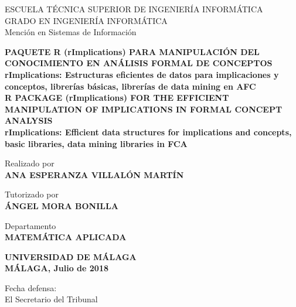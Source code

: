 \newpage
\thispagestyle{empty}
\mbox{}
\newpage
\thispagestyle{empty}
\mbox{}

\begin{titlepage}

    \begin{center}
		\normalsize {
            ESCUELA T\'ECNICA SUPERIOR DE INGENIER\'IA INFORM\'ATICA \\
            GRADO EN INGENIER\'IA INFORM\'ATICA \\
            Menci\'on en Sistemas de Informaci\'on \\}
	\end{center}

    \bigskip

    \begin{center}
		\normalsize {\textbf{
            PAQUETE R (rImplications) PARA MANIPULACI\'ON DEL CONOCIMIENTO 
            EN AN\'ALISIS FORMAL DE CONCEPTOS\\
            rImplications: Estructuras eficientes de datos para 
            implicaciones y conceptos, librer\'ias b\'asicas, 
            librer\'ias de data mining en AFC\\
            R PACKAGE (rImplications) FOR THE EFFICIENT MANIPULATION OF 
            IMPLICATIONS IN FORMAL CONCEPT ANALYSIS\\ 
            rImplications: Efficient data structures for implications 
            and concepts, basic libraries, data mining libraries in FCA
            }}
    \end{center}
    
    \smallskip

    \begin{center}
		\normalsize {
            Realizado por \\ \textbf{ANA ESPERANZA VILLAL\'ON MART\'IN}}
    \end{center}

    \begin{center}
		\normalsize {
            Tutorizado por \\ \textbf{\'ANGEL MORA BONILLA}}
    \end{center}

    \begin{center}
		\normalsize {
            Departamento \\ \textbf{MATEM\'ATICA APLICADA}}
    \end{center}

    \begin{center}
		\normalsize {
            \textbf{UNIVERSIDAD DE M\'ALAGA \\ M\'ALAGA, Julio de 2018}}
    \end{center}

    \bigskip

    \bigskip

    \begin{flushleft}
		\normalsize {
            Fecha defensa: \\ El Secretario del Tribunal}
    \end{flushleft}

\end{titlepage}

\newpage
\thispagestyle{empty}
\mbox{}

\newpage